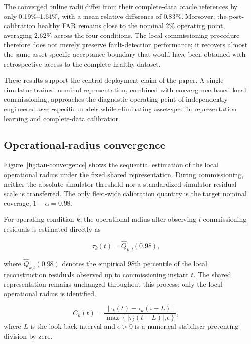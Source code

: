 \documentclass[numbered]{trbunofficial}
\begin{document}
The converged online radii differ from their complete-data oracle references
by only 0.19\%--1.64\%, with a mean relative difference of 0.83\%.
Moreover, the post-calibration healthy FAR remains close to the nominal
2\% operating point, averaging 2.62\% across the four conditions. The local
commissioning procedure therefore does not merely preserve fault-detection
performance; it recovers almost the same asset-specific acceptance boundary
that would have been obtained with retrospective access to the complete
healthy dataset.

These results support the central deployment claim of the paper. A single
simulator-trained nominal representation, combined with convergence-based
local commissioning, approaches the diagnostic operating point of
independently engineered asset-specific models while eliminating
asset-specific representation learning and complete-data calibration.

\subsection{Operational-radius convergence}
\label{sec:radius-convergence-results}

Figure~\ref{fig:tau-convergence} shows the sequential estimation of the
local operational radius under the fixed shared representation. During
commissioning, neither the absolute simulator threshold nor a standardized
simulator residual scale is transferred. The only fleet-wide calibration
quantity is the target nominal coverage,
$1-\alpha=0.98$.

For operating condition $k$, the operational radius after observing $t$
commissioning residuals is estimated directly as

\begin{equation}
\tau_k(t)
=
\widehat{Q}_{k,t}(0.98),
\label{eq:tau-online-p98}
\end{equation}

where $\widehat{Q}_{k,t}(0.98)$ denotes the empirical 98th percentile of
the local reconstruction residuals observed up to commissioning instant
$t$. The shared representation remains unchanged throughout this process;
only the local operational radius is identified.

\begin{equation}
C_k(t)
=
\frac{
\left|\tau_k(t)-\tau_k(t-L)\right|
}{
\max\left\{\left|\tau_k(t-L)\right|,\epsilon\right\}
},
\label{eq:convergence}
\end{equation}
where $L$ is the look-back interval and $\epsilon>0$ is a numerical
stabiliser preventing division by zero.
\end{document}

